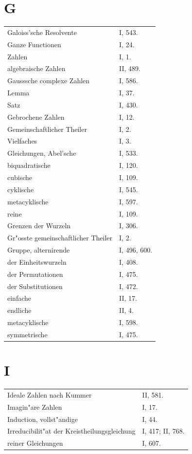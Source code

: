 \documentclass[10pt,a4paper]{article}
\theoremstyle{weberstyle}
\begin{document}
\section*{G}
\begin{flushleft}
\begin{tabular}{@{}p{8cm}l@{}}
Galoiss'sche Resolvente & I, 543.\\[4pt]
Ganze Functionen & I, 24.\\
\quad Zahlen & I, 1.\\
\quad algebraische Zahlen & II, 489.\\[4pt]
Gausssche complexe Zahlen & I, 586.\\
\quad Lemma & I, 37.\\
\quad Satz & I, 430.\\[4pt]
Gebrochene Zahlen & I, 12.\\[4pt]
Gemeinschaftlicher Theiler & I, 2.\\
\quad Vielfaches & I, 3.\\[4pt]
Gleichungen, Abel'sche & I, 533.\\
\quad biquadratische & I, 120.\\
\quad cubische & I, 109.\\
\quad cyklische & I, 545.\\
\quad metacyklische & I, 597.\\
\quad reine & I, 109.\\[4pt]
Grenzen der Wurzeln & I, 306.\\[4pt]
Gr"osste gemeinschaftlicher Theiler & I, 2.\\[4pt]
Gruppe, alternirende & I, 496, 600.\\
\quad der Einheitswurzeln & I, 408.\\
\quad der Permutationen & I, 475.\\
\quad der Substitutionen & I, 472.\\
\quad einfache & II, 17.\\
\quad endliche & II, 4.\\
\quad metacyklische & I, 598.\\
\quad symmetrische & I, 475.
\end{tabular}
\end{flushleft}

\newpage

\section*{I}
\begin{flushleft}
\begin{tabular}{@{}p{8cm}l@{}}
Ideale Zahlen nach Kummer & II, 581.\\[4pt]
Imagin"are Zahlen & I, 17.\\[4pt]
Induction, vollst"andige & I, 44.\\[4pt]
Irreducibilit"at der Kreistheilungsgleichung & I, 417; II, 768.\\
\quad reiner Gleichungen & I, 607.
\end{tabular}
\end{flushleft}
\end{document}
